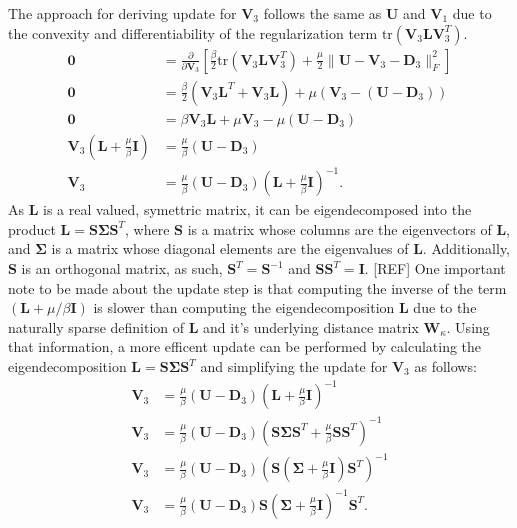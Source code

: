 The approach for deriving update for $\mathbf{V}_3$ follows the same as $\mathbf{U}$ and $\mathbf{V}_1$ due to the convexity and differentiability of the regularization term $\text{tr}(\mathbf{V}_3\mathbf{L}\mathbf{V}_3^T)$. 
\begin{equation*}
  \begin{aligned}
    \mathbf{0} &= \frac{\partial}{\partial \mathbf{V}_3}\left[ \frac{\beta}{2} \text{tr}(\mathbf{V}_3\mathbf{L}\mathbf{V}_3^T) + \frac{\mu}{2} \|\mathbf{U} - \mathbf{V}_3 - \mathbf{D}_3\|_F^2  \right]
    \\
    \mathbf{0} &= \frac{\beta}{2} (\mathbf{V}_3\mathbf{L}^T + \mathbf{V}_3 \mathbf{L}) + \mu (\mathbf{V}_3 - (\mathbf{U} - \mathbf{D}_3))
    \\
    \mathbf{0} &= \beta \mathbf{V}_3 \mathbf{L} + \mu \mathbf{V}_3 - \mu (\mathbf{U} - \mathbf{D}_3)
    \\
    \mathbf{V}_3 \left(\mathbf{L} + \frac{\mu}{\beta} \mathbf{I}\right) &= \frac{\mu}{\beta}(\mathbf{U} - \mathbf{D}_3)
    \\
    \mathbf{V}_3 &= \frac{\mu}{\beta}(\mathbf{U} - \mathbf{D}_3) \left(\mathbf{L} + \frac{\mu}{\beta} \mathbf{I}\right)^{-1}.
  \end{aligned}
\end{equation*}
As $\mathbf{L}$ is a real valued, symettric matrix, it can be eigendecomposed into the product $\mathbf{L} = \mathbf{S \Sigma S}^T$, where $\mathbf{S}$ is a matrix whose columns are the eigenvectors of $\mathbf{L}$, and $\mathbf{\Sigma}$ is a matrix whose diagonal elements are the eigenvalues of $\mathbf{L}$. Additionally, $\mathbf{S}$ is an orthogonal matrix, as such, $\mathbf{S}^T = \mathbf{S}^{-1}$ and $\mathbf{SS}^T = \mathbf{I}$. [REF] One important note to be made about the update step is that computing the inverse of the term $(\mathbf{L} + \mu / \beta \mathbf{I})$ is slower than computing the eigendecomposition $\mathbf{L}$ due to the naturally sparse definition of $\mathbf{L}$ and it's underlying distance matrix $\mathbf{W}_{\kappa}$. Using that information, a more efficent update can be performed by calculating the eigendecomposition $\mathbf{L} = \mathbf{S \Sigma S}^T$ and simplifying the update for $\mathbf{V}_3$ as follows:
\begin{equation*}
  \begin{aligned}
    \mathbf{V}_3 &= \frac{\mu}{\beta}(\mathbf{U} - \mathbf{D}_3) \left(\mathbf{L} + \frac{\mu}{\beta} \mathbf{I}\right)^{-1}
    \\
    \mathbf{V}_3 &= \frac{\mu}{\beta}(\mathbf{U} - \mathbf{D}_3) \left(\mathbf{S \Sigma S}^T + \frac{\mu}{\beta} \mathbf{SS}^T\right)^{-1}
    \\ 
    \mathbf{V}_3 &= \frac{\mu}{\beta}(\mathbf{U} - \mathbf{D}_3) 
    \left(\mathbf{S}\left(\mathbf{\Sigma} + \frac{\mu}{\beta} \mathbf{I}\right)  \mathbf{S}^T\right)^{-1}
    \\
    \mathbf{V}_3 &= \frac{\mu}{\beta}(\mathbf{U} - \mathbf{D}_3) \mathbf{S} \left(\mathbf{\Sigma} + \frac{\mu}{\beta} \mathbf{I}\right)^{-1} \mathbf{S}^T.
  \end{aligned}
\end{equation*}
